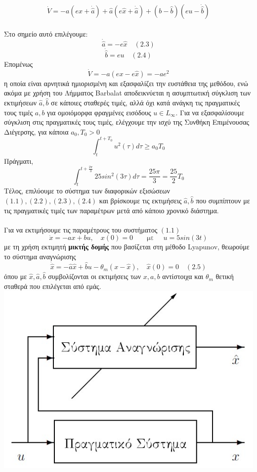 \documentclass[12pt]{article}
\begin{document}
\[ \dot{V}= -a(ex+\dot{\hat{a}})+\hat{a}(e\hat{x}+\dot{\hat{a}}) +(b-\hat{b})(eu-\dot{\hat{b}})\]
\\
Στο σημείο αυτό επιλέγουμε:
\[ \dot{\hat{a}}=-e\hat{x} \quad (2.3)\]
\[\dot{\hat{b}}=eu \quad (2.4)\]
Επομένως
\[ \dot{V}= -a(ex-e\hat{x})=-ae^{2} \]
η οποία είναι αρνητικά ημιορισμένη και εξασφαλίζει την ευστάθεια της μεθόδου, ενώ ακόμα με χρήση του Λήμματος Barbalat αποδεικνύεται η ασυμπτωτική σύγκλιση των εκτιμήσεων $\hat{a},\hat{b}$ σε κάποιες σταθερές τιμές, αλλά όχι κατά ανάγκη τις πραγματικές τους τιμές $a,b$ για ομοιόμορφα φραγμένες εισόδους $u \in L_{\infty}$. Για να εξασφαλίσουμε σύγκλιση στις πραγματικές τους τιμές, ελέγχουμε την ισχύ της Συνθήκη Επιμένουσας  Διέγερσης, για κάποια $a_0,T_0 > 0 $
\[ \int_{t}^{t+T_0} u^2(\tau)d\tau \geq a_0T_0 \]
Πράγματι,
\[ \int_{t}^{t+\frac{2\pi}{3}} 25sin^2(3\tau)d\tau =\frac{25\pi}{3}=\frac{25}{2}T_0 \]
Τέλος, επιλύουμε το σύστημα των διαφορικών εξισώσεων $(1.1),(2.2),(2.3),(2.4)$ και βρίσκουμε τις εκτιμήσεις $\hat{a},\hat{b}$ που συμπίπτουν με τις πραγματικές τιμές των παραμέτρων μετά από κάποιο χρονικό διάστημα.
\\ \\
Για να εκτιμήσουμε τις παραμέτρους του συστήματος $(1.1)$ 
\[ \dot{x}=-ax+bu , \quad x(0)=0 \qquad \text{με }  \quad u=5sin(3t) \]
με τη χρήση εκτιμητή \textbf{μικτής δομής} που βασίζεται στη μέθοδο Lyapunov, θεωρούμε το σύστημα αναγνώρισης
\[ \dot{\hat{x}}=-\hat{a}\hat{x}+\hat{b}u-\theta_m(x-\hat{x}) , \quad \hat{x}(0)=0 \quad (2.5) \]
όπου με $\hat{x},\hat{a},\hat{b}$ συμβολίζονται οι εκτιμήσεις των $x,a,b$ αντίστοιχα και $\theta_m$ θετική σταθερά που επιλέγεται από εμάς.
\\
\includegraphics[width=\linewidth]{Mix.jpg}
\end{document}
